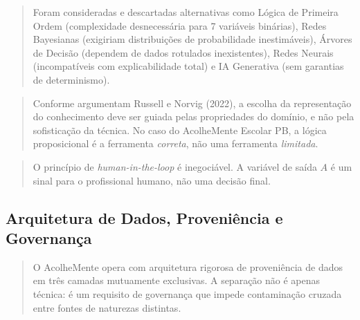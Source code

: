 \documentclass[11pt]{article}
\begin{document}
\begin{quote}
Foram consideradas e descartadas alternativas como Lógica de Primeira
Ordem (complexidade desnecessária para 7 variáveis binárias), Redes
Bayesianas (exigiriam distribuições de probabilidade inestimáveis),
Árvores de Decisão (dependem de dados rotulados inexistentes), Redes
Neurais (incompatíveis com explicabilidade total) e IA Generativa (sem
garantias de determinismo).
\end{quote}

\begin{quote}
Conforme argumentam Russell e Norvig (2022), a escolha da representação
do conhecimento deve ser guiada pelas propriedades do domínio, e não
pela sofisticação da técnica. No caso do AcolheMente Escolar PB, a
lógica proposicional é a ferramenta \emph{correta}, não uma ferramenta
\emph{limitada}.
\end{quote}

\begin{quote}
O princípio de \emph{human-in-the-loop} é inegociável. A variável de
saída \(A\) é um sinal para o profissional humano, não uma decisão
final.
\end{quote}

\subsection{Arquitetura de Dados, Proveniência e
Governança}\label{arquitetura-de-dados-proveniuxeancia-e-governanuxe7a}

\begin{quote}
O AcolheMente opera com arquitetura rigorosa de proveniência de dados em
três camadas mutuamente exclusivas. A separação não é apenas técnica: é
um requisito de governança que impede contaminação cruzada entre fontes
de naturezas distintas.
\end{quote}
\end{document}
